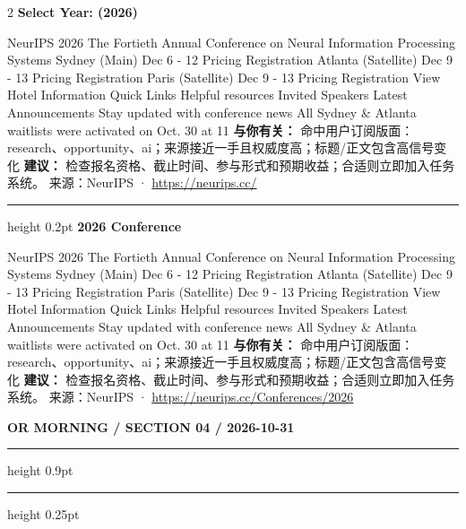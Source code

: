 \documentclass[10.5pt]{ctexart}
\begin{document}
\begin{multicols}{2}
{\large\bfseries Select Year: (2026)}\par
NeurIPS 2026 The Fortieth Annual Conference on Neural Information Processing Systems Sydney (Main) Dec 6 - 12 Pricing Registration Atlanta (Satellite) Dec 9 - 13 Pricing Registration Paris (Satellite) Dec 9 - 13 Pricing Registration View Hotel Information Quick Links Helpful resources Invited Speakers Latest Announcements Stay updated with conference news All Sydney \& Atlanta waitlists were activated on Oct. 30 at 11
\textbf{与你有关：} 命中用户订阅版面：research、opportunity、ai；来源接近一手且权威度高；标题/正文包含高信号变化
\textbf{建议：} 检查报名资格、截止时间、参与形式和预期收益；合适则立即加入任务系统。
{\footnotesize\color{ormuted} 来源：NeurIPS · \url{https://neurips.cc/}}
\vspace{2mm}
\hrule height 0.2pt
\vspace{2mm}
{\large\bfseries 2026 Conference}\par
NeurIPS 2026 The Fortieth Annual Conference on Neural Information Processing Systems Sydney (Main) Dec 6 - 12 Pricing Registration Atlanta (Satellite) Dec 9 - 13 Pricing Registration Paris (Satellite) Dec 9 - 13 Pricing Registration View Hotel Information Quick Links Helpful resources Invited Speakers Latest Announcements Stay updated with conference news All Sydney \& Atlanta waitlists were activated on Oct. 30 at 11
\textbf{与你有关：} 命中用户订阅版面：research、opportunity、ai；来源接近一手且权威度高；标题/正文包含高信号变化
\textbf{建议：} 检查报名资格、截止时间、参与形式和预期收益；合适则立即加入任务系统。
{\footnotesize\color{ormuted} 来源：NeurIPS · \url{https://neurips.cc/Conferences/2026}}
\end{multicols}
\newpage
{\small\bfseries OR MORNING / SECTION 04 / 2026-10-31}
\vspace{2mm}
\hrule height 0.9pt
\vspace{1.5mm}
\hrule height 0.25pt
\vspace{4mm}
\end{document}
